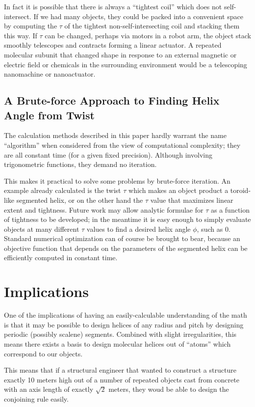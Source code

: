 \documentclass[11pt]{article}
\begin{document}
{In fact it is possible that there is always a ``tightest coil''
which does not self-intersect. If we had many objects,
they could be packed into a convenient space by computing the $\tau$
of the tightest non-self-intersecting coil and stacking them this way.
If $\tau$ can be changed, perhaps via motors in a robot arm,
the object stack smoothly telescopes and contracts forming a
linear actuator.
A repeated molecular subunit that changed shape in
response to an external magnetic or electric field or chemicals in the surrounding
environment would be a telescoping nanomachine or nanoactuator.


\subsection{A Brute-force Approach to Finding Helix Angle from Twist}

The calculation methods described in this paper hardly warrant the name ``algorithm'' when considered from the view of computational complexity;
they are all constant time (for a given fixed precision).
Although involving trigonometric functions, they demand no iteration.

This makes it practical to solve some problems by brute-force iteration.
An example already calculated is the twist $\tau$ which makes
an object product a toroid-like segmented helix, or on the other hand
the $\tau$ value that maximizes linear extent and tightness.
Future work may allow analytic formulae for $\tau$ as a function of
tightness to be developed; in the meantime it is easy enough
to simply evaluate objects at many different $\tau$ values to find a
desired helix angle $\phi$, such as $0$.
Standard numerical optimization can of course be brought to bear, because an objective function
that depends on the parameters of the segmented helix can
be efficiently computed in constant time.

\section{Implications}

One of the implications of having an easily-calculable understanding of the math
is that it may be possible to design helices
of any radius and pitch by designing periodic (possibly scalene) segments.
Combined with slight
irregularities, this means there exists a basis to design molecular helices
out of ``atoms'' which correspond to our objects.

This means that if a structural engineer that wanted to construct a structure exactly 10 meters high
out of a number of repeated objects cast from concrete with an axis length of  exactly $\sqrt{2}$ meters,
they woud be able to design the conjoining rule easily.

}
\end{document}
